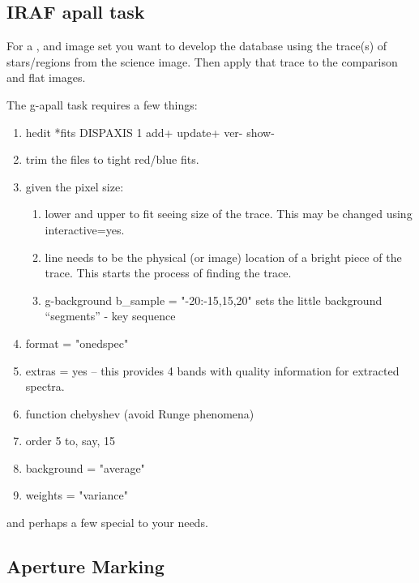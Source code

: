 \renewcommand{\footerfilename}{apall.tex}
\subsection{IRAF apall task}  \label{sec:apall}

\example For a ,  and  image set you
want to develop the database using the trace(s) of stars/regions from
the science image. Then apply that trace to the comparison and flat
images.

The \gls{g-apall} task requires a few things:
\vspace{-.15cm}
\begin{enumerate}\addtolength{\itemsep}{-0.5\baselineskip}
   \item   hedit *fits DISPAXIS 1 add+ update+ ver- show-
   \item   trim the files to tight red/blue fits. 
   \item   given the pixel size:
\vspace{-.15cm}
\begin{enumerate}\addtolength{\itemsep}{-0.5\baselineskip}
   \item   lower and upper to fit seeing size of the trace. This may be changed
   using interactive=yes.
   \item   line needs to be the physical (or image) location of a bright piece of
   the trace. This starts the process of finding the trace.
   \item   \gls{g-background} b\_sample = "-20:-15,15,20" sets the little background
   ``segments'' - key sequence
\end{enumerate}
   \item   format = "onedspec"
   \item   extras = yes -- this provides 4 bands with quality information for
           extracted spectra.
   \item   function chebyshev (avoid Runge phenomena)
   \item   order 5 to, say, 15
   \item   background = "average"
   \item   weights = "variance"
\end{enumerate}


and perhaps a few special to your needs.

\subsection{Aperture Marking}

